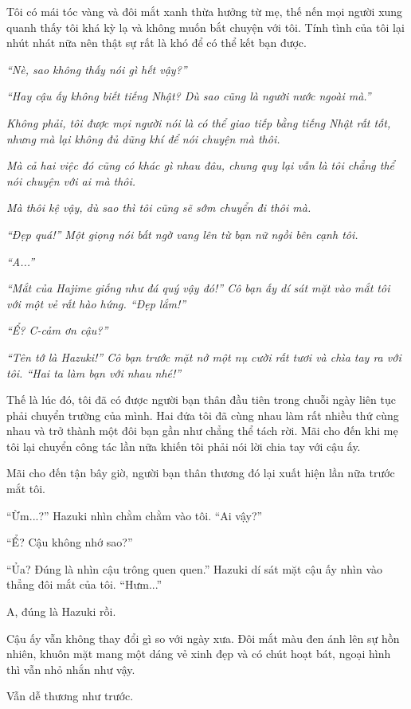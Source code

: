 {Tôi có mái tóc vàng và đôi mắt xanh thừa hưởng từ mẹ, thế nến mọi người
xung quanh thấy tôi khá kỳ lạ và không muốn bắt chuyện với tôi. Tính
tình của tôi lại nhút nhát nữa nên thật sự rất là khó để có thể kết bạn
được.

\emph{``Nè, sao không thấy nói gì hết vậy?''}

\emph{``Hay cậu ấy không biết tiếng Nhật? Dù sao cũng là người nước
ngoài mà.''}

\emph{Không phải, tôi được mọi người nói là có thể giao tiếp bằng tiếng
Nhật rất tốt, nhưng mà lại không đủ dũng khí để nói chuyện mà thôi.}

\emph{Mà cả hai việc đó cũng có khác gì nhau đâu, chung quy lại vẫn là
tôi chẳng thể nói chuyện với ai mà thôi.}

\emph{Mà thôi kệ vậy, dù sao thì tôi cũng sẽ sớm chuyển đi thôi mà.}

\emph{``Đẹp quá!'' Một giọng nói bất ngờ vang lên từ bạn nữ ngồi bên
cạnh tôi.}

\emph{``A...''}

\emph{``Mắt của Hajime giống như đá quý vậy đó!'' Cô bạn ấy dí sát mặt
vào mắt tôi với một vẻ rất hào hứng. ``Đẹp lắm!''}

\emph{``Ể? C-cảm ơn cậu?''}

\emph{``Tên tớ là Hazuki!'' Cô bạn trước mặt nở một nụ cười rất tươi và
chìa tay ra với tôi. ``Hai ta làm bạn với nhau nhé!''}

Thế là lúc đó, tôi đã có được người bạn thân đầu tiên trong chuỗi ngày
liên tục phải chuyển trường của mình. Hai đứa tôi đã cùng nhau làm rất
nhiều thứ cùng nhau và trở thành một đôi bạn gần như chẳng thể tách rời.
Mãi cho đến khi mẹ tôi lại chuyển công tác lần nữa khiến tôi phải nói
lời chia tay với cậu ấy.

Mãi cho đến tận bây giờ, người bạn thân thương đó lại xuất hiện lần nữa
trước mắt tôi.

``Ừm...?'' Hazuki nhìn chằm chằm vào tôi. ``Ai vậy?''

``Ể? Cậu không nhớ sao?''

``Ủa? Đúng là nhìn cậu trông quen quen.'' Hazuki dí sát mặt cậu ấy nhìn
vào thẳng đôi mắt của tôi. ``Hưm...''

A, đúng là Hazuki rồi.

Cậu ấy vẫn không thay đổi gì so với ngày xưa. Đôi mắt màu đen ánh lên sự
hồn nhiên, khuôn mặt mang một dáng vẻ xinh đẹp và có chút hoạt bát,
ngoại hình thì vẫn nhỏ nhắn như vậy.

Vẫn dễ thương như trước.

}
